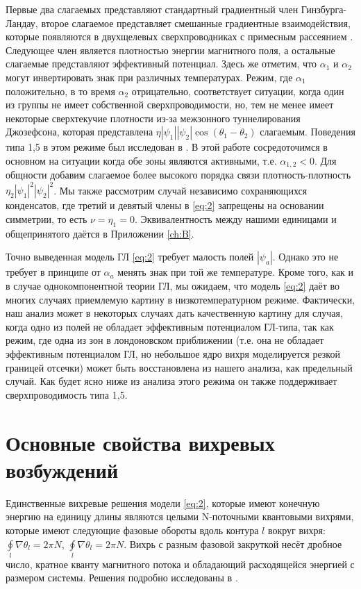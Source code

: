 Первые два слагаемых представляют стандартный градиентный член 
Гинзбурга-Ландау, второе слагаемое представляет смешанные градиентные 
взаимодействия, которые появляются в двухщелевых сверхпроводниках с примесным 
рассеянием \cite{bib:8,bib:9}. Следующее член является плотностью энергии 
магнитного поля, а остальные слагаемые представляют эффективный потенциал. 
Здесь же отметим, что \( \alpha_1 \) и \( \alpha_2 \) могут инвертировать знак 
при различных температурах. Режим, где \( \alpha_1 \) положительно, в то время 
\( \alpha_2 \) отрицательно, соответствует ситуации, когда один из группы 
не имеет собственной сверхпроводимости, но, тем не менее имеет некоторые 
сверхтекучие плотности из-за межзонного туннелирования Джозефсона, которая 
представлена \( \eta|\psi_1||\psi_2|\cos(\theta_1-\theta_2) \) слагаемым. 
Поведения типа 1,5 в этом режиме был исследован в \cite{bib:2}. В этой работе 
сосредоточимся в основном на ситуации когда обе зоны являются активными, 
т.е. \( \alpha_{1,2} < 0 \). Для общности добавим слагаемое более высокого 
порядка связи плотность-плотность \( \eta_2|\psi_1|^2|\psi_2|^2 \). Мы также 
рассмотрим случай независимо сохраняющихся конденсатов, где третий и девятый 
члены в \eqref{eq:2} запрещены на основании симметрии, то есть 
\( \nu = \eta_1 = 0 \). Эквивалентность между нашими единицами и общепринятого 
даётся в Приложении \ref{ch:B}.

Точно выведенная модель ГЛ \eqref{eq:2} требует малость полей \( |\psi_a| \). 
Однако это не требует в принципе от \( \alpha_a \) менять знак при той же 
температуре. Кроме того, как и в случае однокомпонентной теории ГЛ, мы 
ожидаем, что модель \eqref{eq:2} даёт во многих случаях приемлемую картину 
в низкотемпературном режиме. Фактически, наш анализ может в некоторых случаях 
дать качественную картину для случая, когда одно из полей не обладает 
эффективным потенциалом ГЛ-типа, так как режим, где одна из зон в лондоновском 
приближении (т.е. она не обладает эффективным потенциалом ГЛ, но небольшое ядро 
вихря моделируется резкой границей отсечки) может быть восстановлена из 
нашего анализа, как предельный случай. Как будет ясно ниже из анализа этого 
режима он также поддерживает сверхпроводимость типа 1,5.

\section{Основные свойства вихревых возбуждений}

Единственные вихревые решения модели \eqref{eq:2}, которые имеют конечную 
энергию на единицу длины являются целыми N-поточными квантовыми вихрями, 
которые имеют следующие фазовые обороты вдоль контура \( l \) вокруг вихря: 
\( \oint\limits_l \nabla\theta_l = 2\pi N \), 
\( \oint\limits_l \nabla\theta_l = 2\pi N \). Вихрь с разным фазовой закруткой 
несёт дробное число, кратное кванту магнитного потока и обладающий 
расходящейся энергией с размером системы. Решения подробно исследованы в 
\cite{bib:22}.


